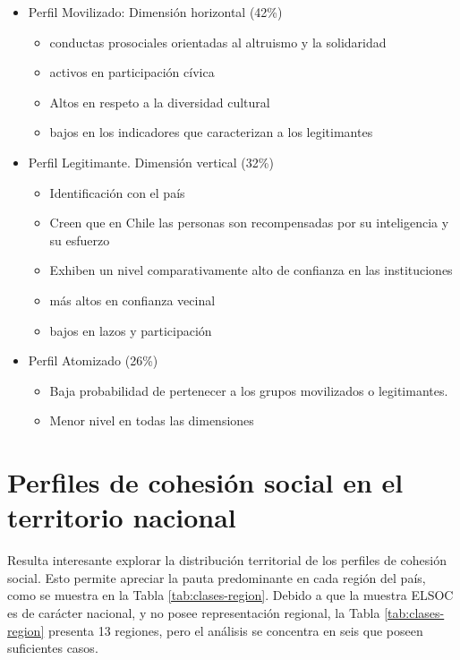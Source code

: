 \documentclass[
  12pt,
]{book}
\providecommand{\tightlist}{%
  \setlength{\itemsep}{0pt}\setlength{\parskip}{0pt}}
\begin{document}
\begin{itemize}
\tightlist
\item
  Perfil Movilizado: Dimensión horizontal (42\%)

  \begin{itemize}
  \tightlist
  \item
    conductas prosociales orientadas al altruismo y la solidaridad
  \item
    activos en participación cívica
  \item
    Altos en respeto a la diversidad cultural
  \item
    bajos en los indicadores que caracterizan a los legitimantes
  \end{itemize}
\item
  Perfil Legitimante. Dimensión vertical (32\%)

  \begin{itemize}
  \tightlist
  \item
    Identificación con el país
  \item
    Creen que en Chile las personas son recompensadas por su inteligencia y su esfuerzo
  \item
    Exhiben un nivel comparativamente alto de confianza en las instituciones
  \item
    más altos en confianza vecinal
  \item
    bajos en lazos y participación
  \end{itemize}
\item
  Perfil Atomizado (26\%)

  \begin{itemize}
  \tightlist
  \item
    Baja probabilidad de pertenecer a los grupos movilizados o legitimantes.
  \item
    Menor nivel en todas las dimensiones
  \end{itemize}
\end{itemize}

\hypertarget{perfiles-de-cohesiuxf3n-social-en-el-territorio-nacional}{%
\section{Perfiles de cohesión social en el territorio nacional}\label{perfiles-de-cohesiuxf3n-social-en-el-territorio-nacional}}

Resulta interesante explorar la distribución territorial de los perfiles de cohesión social. Esto permite apreciar la pauta predominante en cada región del país, como se muestra en la Tabla \ref{tab:clases-region}. Debido a que la muestra ELSOC es de carácter nacional, y no posee representación regional, la Tabla \ref{tab:clases-region} presenta 13 regiones, pero el análisis se concentra en seis que poseen suficientes casos.
\end{document}
